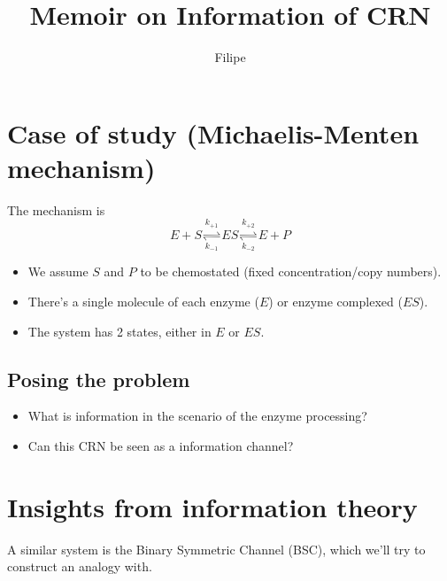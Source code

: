 \documentclass[11pt]{amsart}
\title{Memoir on Information of CRN}
\author{Filipe}
\begin{document}
\maketitle
\section{Case of study (Michaelis-Menten mechanism)}
The mechanism is
\begin{equation}
E + S \underset{k_{-1}}{\overset{k_{+1}}{\rightleftharpoons}} ES  \underset{k_{-2}}{\overset{k_{+2}}{\rightleftharpoons}} E + P
\end{equation}

\begin{itemize}
\item We assume $S$ and $P$ to be chemostated (fixed concentration/copy numbers).
\item There's a single molecule of each enzyme ($E$) or enzyme complexed ($ES$).
\item The system has 2 states, either in $E$ or $ES$.
\end{itemize}

\subsection{Posing the problem}
\begin{itemize}
\item What is information in the scenario of the enzyme processing?
\item Can this CRN be seen as a information channel?
\end{itemize}

\section{Insights from information theory}
A similar system is the Binary Symmetric Channel (BSC), which we'll try to construct an analogy with.
\end{document}

